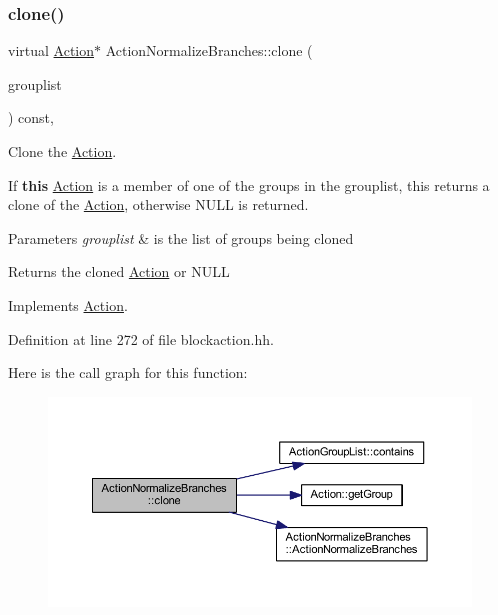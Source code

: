 \subsubsection{\texorpdfstring{clone()}{clone()}}
{\footnotesize\ttfamily virtual \mbox{\hyperlink{class_action}{Action}}$\ast$ Action\+Normalize\+Branches\+::clone (\begin{DoxyParamCaption}\item[{const \mbox{\hyperlink{class_action_group_list}{Action\+Group\+List}} \&}]{grouplist }\end{DoxyParamCaption}) const\hspace{0.3cm}{\ttfamily [inline]}, {\ttfamily [virtual]}}



Clone the \mbox{\hyperlink{class_action}{Action}}. 

If {\bfseries{this}} \mbox{\hyperlink{class_action}{Action}} is a member of one of the groups in the grouplist, this returns a clone of the \mbox{\hyperlink{class_action}{Action}}, otherwise N\+U\+LL is returned. 
\begin{DoxyParams}{Parameters}
{\em grouplist} & is the list of groups being cloned \\
\hline
\end{DoxyParams}
\begin{DoxyReturn}{Returns}
the cloned \mbox{\hyperlink{class_action}{Action}} or N\+U\+LL 
\end{DoxyReturn}


Implements \mbox{\hyperlink{class_action_af8242e41d09e5df52f97df9e65cc626f}{Action}}.



Definition at line 272 of file blockaction.\+hh.

Here is the call graph for this function\+:
\nopagebreak
\begin{figure}[H]
\begin{center}
\leavevmode
\includegraphics[width=350pt]{class_action_normalize_branches_a74bdc9457fe995592298c253dbf9fd88_cgraph}
\end{center}
\end{figure}


